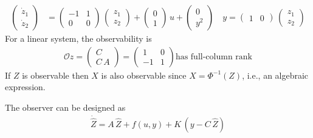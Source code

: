 \begin{align*}
    \begin{pmatrix}
        \dot z_1 \\ \dot z_2
    \end{pmatrix} &= \begin{pmatrix}
        -1 & 1 \\ 0 & 0
    \end{pmatrix}\,\begin{pmatrix}
        z_1 \\ z_2
    \end{pmatrix} + \begin{pmatrix}
        0 \\ 1
    \end{pmatrix}\,u + \begin{pmatrix}
        0 \\ y^2
    \end{pmatrix} \quad y = \begin{pmatrix}
        1 & 0
    \end{pmatrix}\,\begin{pmatrix}
        z_1 \\ z_2
    \end{pmatrix}
\end{align*}
For a linear system, the observability is 
\begin{align*}
    \mathcal{O}z = \begin{pmatrix}
        C \\ C\,A
    \end{pmatrix} = \begin{pmatrix}
        1 & 0 \\ -1 & 1
    \end{pmatrix} \text{has full-column rank}
\end{align*}
If $Z$ is observable then $X$ is also observable since $X = \Phi^{-1}(Z)$, i.e., an algebraic expression.

The observer can be designed as 
\begin{align*}
\dot{\hat Z} = A\,\hat Z + f(u,y) + K\,\left(y - C\,\hat Z \right)
\end{align*}

